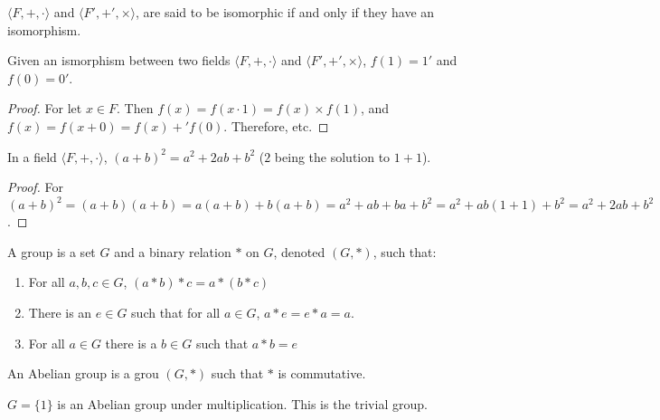 \documentclass[crop=false,class=book,oneside]{standalone}
\begin{document}
        \begin{definition}
        $\langle F,+,\cdot \rangle$ and $\langle F', +',\times \rangle$, are said to be isomorphic if and only if they have an isomorphism.
        \end{definition}
        \begin{theorem}
        Given an ismorphism between two fields $\langle F,+,\cdot \rangle$ and $\langle F', +',\times \rangle$, $f(1) = 1'$ and $f(0) = 0'$.
        \end{theorem}
        \begin{proof}
        For let $x\in F$. Then $f(x)=f(x\cdot 1) = f(x)\times f(1)$, and $f(x)=f(x+0) = f(x)+'f(0)$. Therefore, etc.
        \end{proof}
        \begin{theorem}
        In a field $\langle F,+,\cdot \rangle$, $(a+ b)^2 = a^2 + 2ab + b^2$ ($2$ being the solution to $1+1$).
        \end{theorem}
        \begin{proof}
        For $(a+b)^2 = (a+b)(a+b) = a(a+b)+b(a+b) = a^2 + ab + ba + b^2 = a^2 +ab(1+1)+b^2 = a^2 + 2ab + b^2$.
        \end{proof}
        \begin{definition}
            A group is a set $G$ and a binary relation $*$
            on $G$, denoted $(G,*)$, such that:
            \begin{enumerate}
                \item For all ${a,b,c}\in{G}$, $(a*b)*c=a*(b*c)$
                \item There is an ${e}\in{G}$ such that for all
                    ${a}\in{G}$, $a*e=e*a=a$.
                \item For all ${a}\in{G}$ there is a ${b}\in{G}$
                    such that $a*b=e$
            \end{enumerate}
        \end{definition}
        \begin{definition}
            An Abelian group is a grou $(G,*)$ such that
            $*$ is commutative.
        \end{definition}
        \begin{example}
            $G=\{1\}$ is an Abelian group
            under multiplication.
            This is the trivial group.
        \end{example}
\end{document}
